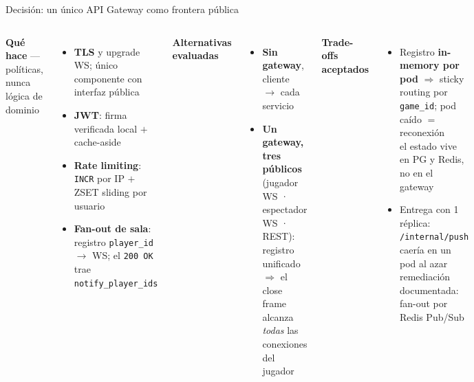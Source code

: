 \documentclass[aspectratio=169,10pt]{beamer}
\begin{document}
\begin{frame}{Decisión: un único API Gateway como frontera pública}
  \vspace{-1mm}
  \begin{columns}[T]
      \textbf{\small Qué hace} {\scriptsize --- políticas, nunca lógica de dominio}
      \begin{itemize}\scriptsize
        \item \textbf{TLS} y upgrade WS; único componente con interfaz pública
        \item \textbf{JWT}: firma verificada local $+$ cache-aside
        \item \textbf{Rate limiting}: \texttt{INCR} por IP $+$ ZSET sliding por usuario
        \item \textbf{Fan-out de sala}: registro \texttt{player\_id} $\to$ WS; el \texttt{200 OK} trae \texttt{notify\_player\_ids}
      \end{itemize}
      \textbf{\small Alternativas evaluadas}
      \begin{itemize}\scriptsize
        \item[\textcolor{cRedis}{\ding{55}}] \textbf{Sin gateway}, cliente $\to$ cada servicio
        \item[\textcolor{cPG}{\ding{51}}] \textbf{Un gateway, tres públicos}\\ {\tiny (jugador WS · espectador WS · REST): registro unificado $\Rightarrow$ el close frame alcanza \emph{todas} las conexiones del jugador}
      \end{itemize}
      \vspace{1mm}
      \textbf{\small Trade-offs aceptados}
      \begin{itemize}\scriptsize
        \item Registro \textbf{in-memory por pod} $\Rightarrow$ sticky routing por \texttt{game\_id}; pod caído $=$ reconexión\\
              {\tiny el estado vive en PG y Redis, no en el gateway}
        \item Entrega con \alert{1 réplica}: \texttt{/internal/push} caería en un pod al azar\\
              {\tiny remediación documentada: fan-out por Redis Pub/Sub}
      \end{itemize}
  \end{columns}
\end{frame}
\end{document}
